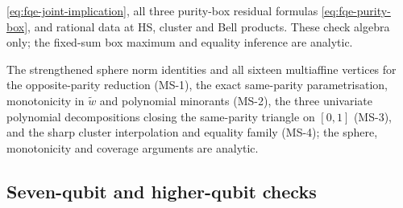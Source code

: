 \begin{description}
\eqref{eq:fqe-joint-implication}, all three purity-box residual formulas
\eqref{eq:fqe-purity-box}, and rational data at HS, cluster and Bell products.
These check algebra only; the fixed-sum box maximum and equality inference
are analytic.
\item[MS-1--MS-4] The strengthened sphere norm identities and all sixteen multiaffine vertices for the
opposite-parity reduction (MS-1), the exact same-parity parametrisation, monotonicity in $\tilde w$ and
polynomial minorants (MS-2), the three univariate polynomial decompositions closing the same-parity triangle
on $[0,1]$ (MS-3), and the sharp cluster interpolation and equality family (MS-4); the sphere, monotonicity
and coverage arguments are analytic.
\end{description}
\subsection{Seven-qubit and higher-qubit checks}
